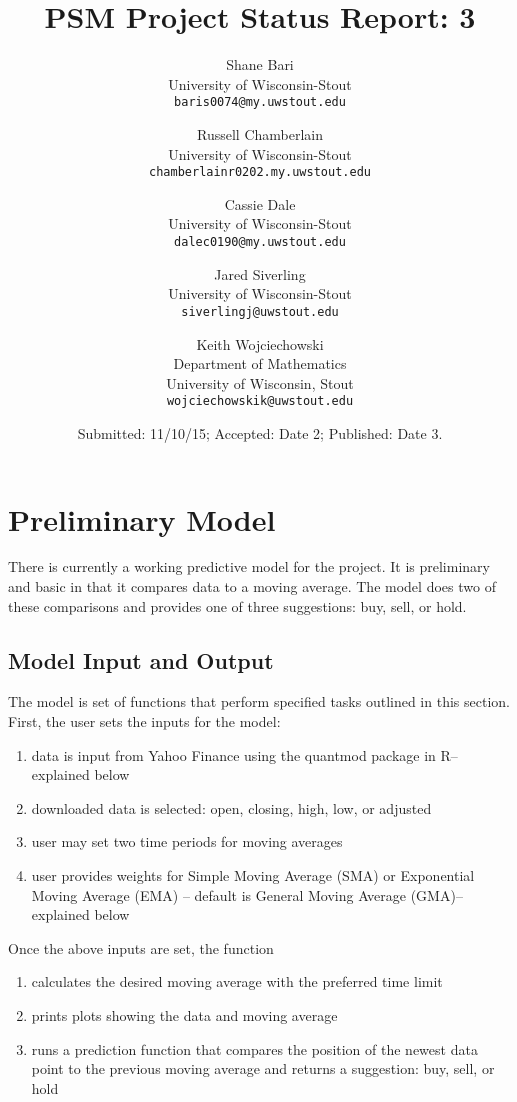 \documentclass[11pt]{article}
\title{PSM Project Status Report: 3}
\author{
Shane Bari\\
\small University of Wisconsin-Stout\\[-0.8ex]
\small \texttt{baris0074@my.uwstout.edu}
\and
Russell Chamberlain\\
\small University of Wisconsin-Stout\\[-0.8ex]
\small \texttt{chamberlainr0202.my.uwstout.edu}
\and
Cassie Dale\\
\small University of Wisconsin-Stout\\[-0.8ex]
\small \texttt{dalec0190@my.uwstout.edu}
\and
Jared Siverling\\
\small University of Wisconsin-Stout\\[-0.8ex]
\small \texttt{siverlingj@uwstout.edu}
\and
Keith Wojciechowski\\
\small Department of Mathematics\\[-0.8ex]
\small University of Wisconsin, Stout\\[-0.8ex]
\small \texttt{wojciechowskik@uwstout.edu}
}
\date{\small Submitted: 11/10/15;  Accepted: Date 2;  Published: Date 3.}
\begin{document}
\maketitle



\section*{\hspace{-.5cm} Preliminary Model}\label{PM}
There is currently a working predictive model for the project. It is preliminary and basic in that it compares data to a moving average. The model does two of these comparisons and provides one of three suggestions: buy, sell, or hold.

\subsection*{Model Input and Output}\label{PMWID}

The model is set of functions that perform specified tasks outlined in this section. First, the user sets the inputs for the model:
\begin{enumerate}
	\item data is input from Yahoo Finance using the quantmod package in R--explained below
	\item downloaded data is selected: open, closing, high, low, or adjusted
	\item user may set two time periods for moving averages
	\item user provides weights for Simple Moving Average (SMA) or Exponential Moving Average (EMA) -- default is General Moving Average (GMA)--explained below
\end{enumerate}

\noindent Once the above inputs are set, the function
\begin{enumerate}
	\item calculates the desired moving average with the preferred time limit
	\item prints plots showing the data and moving average
	\item runs a prediction function that compares the position of the newest data point to the previous moving average and returns a suggestion: buy, sell, or hold
\end{enumerate}
\end{document}
